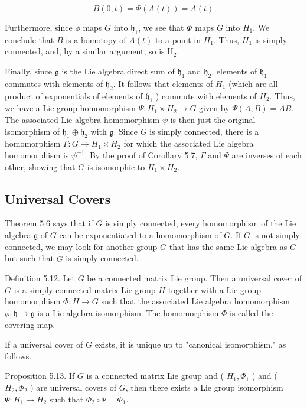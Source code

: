 \documentclass[10pt, letterpaper]{article}
\begin{document}
$$
B(0, t)=\Phi(A(t))=A(t)
$$

Furthermore, since $\phi$ maps $G$ into $\mathfrak{h}_{1}$, we see that $\Phi$ maps $G$ into $H_{1}$. We conclude that $B$ is a homotopy of $A(t)$ to a point in $H_{1}$. Thus, $H_{1}$ is simply connected, and, by a similar argument, so is $\mathrm{H}_{2}$.

Finally, since $\mathfrak{g}$ is the Lie algebra direct sum of $\mathfrak{h}_{1}$ and $\mathfrak{h}_{2}$, elements of $\mathfrak{h}_{1}$ commutes with elements of $\mathfrak{h}_{2}$. It follows that elements of $H_{1}$ (which are all product of exponentials of elements of $\mathfrak{h}_{1}$ ) commute with elements of $H_{2}$. Thus, we have a Lie group homomorphism $\Psi: H_{1} \times H_{2} \rightarrow G$ given by $\Psi(A, B)=A B$. The associated Lie algebra homomorphism $\psi$ is then just the original isomorphism of $\mathfrak{h}_{1} \oplus \mathfrak{h}_{2}$ with $\mathfrak{g}$. Since $G$ is simply connected, there is a homomorphism $\Gamma: G \rightarrow H_{1} \times H_{2}$ for which the associated Lie algebra homomorphism is $\psi^{-1}$. By the proof of Corollary 5.7, $\Gamma$ and $\Psi$ are inverses of each other, showing that $G$ is isomorphic to $H_{1} \times H_{2}$.

\subsection*{Universal Covers}
Theorem 5.6 says that if $G$ is simply connected, every homomorphism of the Lie algebra $\mathfrak{g}$ of $G$ can be exponentiated to a homomorphism of $G$. If $G$ is not simply connected, we may look for another group $\tilde{G}$ that has the same Lie algebra as $G$ but such that $\tilde{G}$ is simply connected.

Definition 5.12. Let $G$ be a connected matrix Lie group. Then a universal cover of $G$ is a simply connected matrix Lie group $H$ together with a Lie group homomorphism $\Phi: H \rightarrow G$ such that the associated Lie algebra homomorphism $\phi: \mathfrak{h} \rightarrow \mathfrak{g}$ is a Lie algebra isomorphism. The homomorphism $\Phi$ is called the covering map.

If a universal cover of $G$ exists, it is unique up to "canonical isomorphism," as follows.

Proposition 5.13. If $G$ is a connected matrix Lie group and ( $H_{1}, \Phi_{1}$ ) and ( $H_{2}, \Phi_{2}$ ) are universal covers of $G$, then there exists a Lie group isomorphism $\Psi: H_{1} \rightarrow H_{2}$ such that $\Phi_{2} \circ \Psi=\Phi_{1}$.
\end{document}
